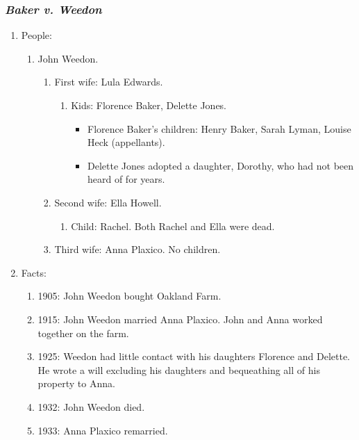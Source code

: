 \subsubsection{\emph{Baker v. Weedon}}

\begin{enumerate}
    \item People:
    \begin{enumerate}
        \item John Weedon.
        \begin{enumerate}
            \item First wife: Lula Edwards.
            \begin{enumerate}
                \item Kids: Florence Baker, Delette Jones.
                \begin{itemize}
                    \item Florence Baker's children: Henry Baker, Sarah Lyman, 
                    Louise Heck (appellants).
                    \item Delette Jones adopted a daughter, Dorothy, who had 
                    not been heard of for years.
                \end{itemize}
            \end{enumerate}
            \item Second wife: Ella Howell.
            \begin{enumerate}
                \item Child: Rachel. Both Rachel and Ella were dead.
            \end{enumerate}
            \item Third wife: Anna Plaxico. No children.
        \end{enumerate}
    \end{enumerate}
    \item Facts:
    \begin{enumerate}
        \item 1905: John Weedon bought Oakland Farm.
        \item 1915: John Weedon married Anna Plaxico. John and Anna worked 
        together on the farm.
        \item 1925: Weedon had little contact with his daughters Florence and 
        Delette. He wrote a will excluding his daughters and bequeathing all 
        of his property to Anna.
        \item 1932: John Weedon died.
        \item 1933: Anna Plaxico remarried.

\end{enumerate}
\end{enumerate}
